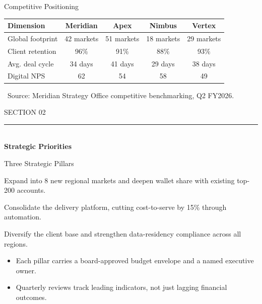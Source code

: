 \documentclass[style=ciment]{powerdot}
\newcommand{\sectiondivider}[2]{%
\begin{slide}{}
\vspace{1.6cm}
\begin{center}
{\Large\textsf{\textcolor{merislate}{#1}}}\\[0.5cm]
{\color{meringold}\rule{4.2cm}{1.6pt}}\\[0.6cm]
{\huge\textbf{\textcolor{merinavy}{#2}}}
\end{center}
\end{slide}}
\begin{document}
\begin{slide}{Competitive Positioning}
\begin{center}
\renewcommand{\arraystretch}{1.3}
\begin{tabular}{@{}lcccc@{}}
\toprule
\rowcolor{merilight}
\textbf{Dimension} & \textbf{Meridian} & \textbf{Apex} & \textbf{Nimbus} & \textbf{Vertex} \\
\midrule
Global footprint & 42 markets & 51 markets & 18 markets & 29 markets \\
Client retention & 96\% & 91\% & 88\% & 93\% \\
Avg. deal cycle & 34 days & 41 days & 29 days & 38 days \\
Digital NPS & 62 & 54 & 58 & 49 \\
\bottomrule
\end{tabular}
\end{center}
\vspace{0.5cm}
{\small\textcolor{merislate}{\faFile\ Source: Meridian Strategy Office competitive benchmarking, Q2 FY2026.}}
\end{slide}

\sectiondivider{SECTION 02}{Strategic Priorities}

\begin{slide}{Three Strategic Pillars}
\begin{minipage}[t]{0.31\linewidth}
\begin{tcolorbox}[meribox, title=\faChartLine\ Growth]
\small
Expand into 8 new regional markets and deepen wallet share with existing top-200 accounts.
\end{tcolorbox}
\end{minipage}\hfill
\begin{minipage}[t]{0.31\linewidth}
\begin{tcolorbox}[meribox, title=\faGlobe\ Efficiency]
\small
Consolidate the delivery platform, cutting cost-to-serve by 15\% through automation.
\end{tcolorbox}
\end{minipage}\hfill
\begin{minipage}[t]{0.31\linewidth}
\begin{tcolorbox}[meribox, title=\faLock\ Resilience]
\small
Diversify the client base and strengthen data-residency compliance across all regions.
\end{tcolorbox}
\end{minipage}

\vspace{0.7cm}
\begin{itemize}
  \item Each pillar carries a board-approved budget envelope and a named executive owner.
  \item Quarterly reviews track leading indicators, not just lagging financial outcomes.
\end{itemize}
\end{slide}
\end{document}
